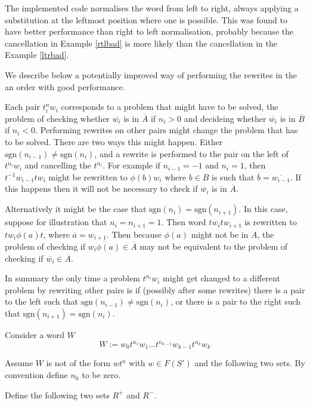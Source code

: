 \documentclass[12pt]{article} %
\theoremstyle{definition}
\theoremstyle{definition}
\theoremstyle{definition}
\theoremstyle{definition}
\begin{document}
The implemented code normalises the word from left to right, always applying
a substitution at the leftmost position where one is possible. This was found to have better
performance than right to left normalisation, probably because the cancellation
in Example \ref{rtlbad} is more likely than the cancellation in the Example \ref{ltrbad}.

We describe below a potentially improved way of performing the rewrites in the
an order with good performance.

Each pair $t^n_iw_i$ corresponds to a problem that might have to be solved, the problem
of checking whether $\overline{w_i}$ is in $\overline{A}$ if $n_i > 0$ and decideing whether
$\overline{w_i}$ is in $\overline{B}$ if $n_i < 0$. Performing rewrites on other pairs
might change the problem that has to be solved. There are two ways this might happen.
Either $\text{sgn}(n_{i-1}) \ne \text{sgn}(n_i)$, and a rewrite is performed
to the pair on the left of $t^{n_i} w_i$ and cancelling the $t^{n_i}$. For example
if $n_{i-1} = -1$ and $n_i = 1$, then $t^{-1}w_{i-1}tw_i$ might be rewritten
to $\phi(b)w_i$ where $b \in B$ is such that $\overline{b} = \overline{w_{i-1}}$.
If this happens then it will not be necessary to check if $\overline{w_i}$ is in
$\overline{A}$.

Alternatively it might be the case that $\text{sgn}(n_i) = \text{sgn}(n_{i+1})$. In this case,
suppose for illustration that $n_i = n_{i+1} = 1$. Then word $tw_itw_{i+1}$ is rewritten
to $tw_i\phi(a)t$, where $\overline{a} = w_{i+1}$. Then because $\phi(a)$ might not be in $A$,
the problem of checking if $\overline{w_i\phi(a)} \in \overline{A}$ may not be equivalent
to the problem of checking if $\overline{w_i} \in \overline{A}$.

In summary the only time a problem $t^{n_i}w_i$ might get changed to a different problem
by rewriting other pairs is if (possibly after some rewrites) there
is a pair to the left such that $\text{sgn}(n_{i-1}) \ne \text{sgn}(n_i)$,
or there is a pair to the right such that $\text{sgn}(n_{i+1}) = \text{sgn}(n_i)$.


Consider a word $W$
\begin{equation}
  W := w_0t^{n_1}w_1 \dots t^{n_{k-1}}w_{k-1}t^{n_k}w_k
\end{equation}

Assume  $W$ is not of the form $wt^n$ with $w \in F(S')$ and the
following two sets. By convention define $n_0$ to be zero.

Define the following two sets $R^+$ and $R^-$.
\end{document}
